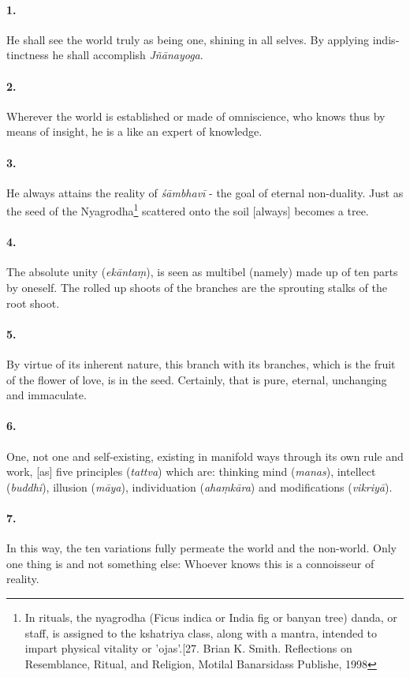 \begin{otherlanguage}{english}
\begin{tlate}
  \paragraph{1.} He shall see the world truly as being one, shining in all selves. By applying indistinctness he shall accomplish \textit{Jñānayoga}.
  \paragraph{2.} Wherever the world is established or made of omniscience, who knows thus by means of insight, he is a like an expert of knowledge.
  \paragraph{3.} He always attains the reality of \textit{śāmbhavī} - the goal of eternal non-duality. Just as the seed of the Nyagrodha\footnote{In rituals, the nyagrodha (Ficus indica or India fig or banyan tree) danda, or staff, is assigned to the kshatriya class, along with a mantra, intended to impart physical vitality or 'ojas'.[27. Brian K. Smith. Reflections on Resemblance, Ritual, and Religion, Motilal Banarsidass Publishe, 1998} scattered onto the soil [always] becomes a tree.
  \paragraph{4.} The absolute unity (\textit{ekāntaṃ}), is seen as multibel (namely) made up of ten parts by oneself. The rolled up shoots of the branches are the sprouting stalks of the root shoot.
  \paragraph{5.} By virtue of its inherent nature, this branch with its branches, which is the fruit of the flower of love, is in the seed. Certainly, that is pure, eternal, unchanging and immaculate. 
  \paragraph{6.} One, not one and self-existing, existing in manifold ways through its own rule and work, [as] five principles (\textit{tattva}) which are: thinking mind (\textit{manas}), intellect (\textit{buddhi}), illusion (\textit{māya}), individuation (\textit{ahaṃkāra}) and modifications (\textit{vikriyā}).
  \paragraph{7.}In this way, the ten variations fully permeate the world and the non-world. Only one thing is and not something else: Whoever knows this is a connoisseur of reality.
  

\end{tlate}
\end{otherlanguage}
